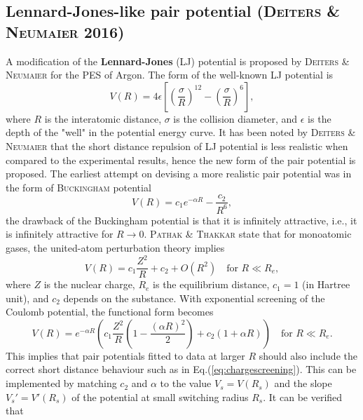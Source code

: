 \documentclass[12pt]{article}
\begin{document}
\subsection{Lennard-Jones-like pair potential (\textsc{Deiters \& Neumaier} 2016)}
A modification of the \textbf{Lennard-Jones} (LJ) potential \cite{ljpot} is proposed by \textsc{Deiters \& Neumaier} \cite{idx178} for the PES of Argon. The form of the well-known LJ potential is
\begin{equation}
    V(R) = 4\epsilon\left[\left(\frac{\sigma}{R}\right)^{12} - \left(\frac{\sigma}{R}\right)^{6} \right],
    \label{eq:lj}
\end{equation}
where $R$ is the interatomic distance, $\sigma$ is the collision diameter, and $\epsilon$ is the depth of the "well" in the potential energy curve. It has been noted by \textsc{Deiters \& Neumaier} \cite{idx178} that the short distance repulsion of LJ potential is less realistic when compared to the experimental results, hence the new form of the pair potential is proposed. The earliest attempt on devising a more realistic pair potential was in the form of \textsc{Buckingham} \cite{buckingham} potential
\begin{equation}
    V(R) = c_1e^{-\alpha R} - \frac{c_2}{R^6},
    \label{eq:buckingham}
\end{equation}
the drawback of the Buckingham potential is that it is infinitely attractive, i.e., it is infinitely attractive for $R \rightarrow 0$. \textsc{Pathak \& Thakkar} \cite{pathak} state that for monoatomic gases, the united-atom perturbation theory implies
\begin{equation}
    V(R) = c_1\frac{Z^2}{R} + c_2 + O(R^2) \quad \text{for }R \ll R_e,
    \label{eq:pathak}
\end{equation}
where $Z$ is the nuclear charge, $R_e$ is the equilibrium distance, $c_1 = 1$ (in Hartree unit), and $c_2$ depends on the substance. With exponential screening of the Coulomb potential, the functional form becomes
\begin{equation}
    V(R) = e^{-\alpha R}
    \left( c_1 \frac{Z^2}{R} 
    \left( 1 - \frac{(\alpha R)^2}{2} \right)
    + c_2(1+ \alpha R)\right) \quad \text{for }R \ll R_e.
    \label{eq:chargescreening}
\end{equation}
This implies that pair potentials fitted to data at larger $R$ should also include the correct short distance behaviour such as in Eq.(\ref{eq:chargescreening}). This can be implemented by matching $c_2$ and $\alpha$ to the value $V_s = V(R_s)$ and the slope $V_s' = V'(R_s)$ of the potential at small switching radius $R_s$. It can be verified that
\end{document}
